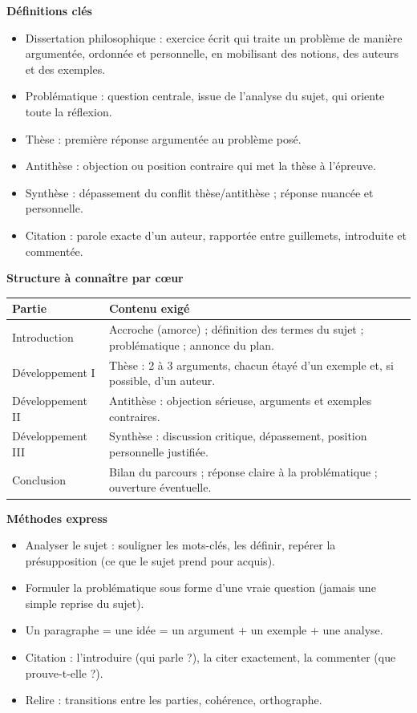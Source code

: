 \documentclass[11pt]{article}
\newcommand{\cle}[1]{{\popxbold\color{popdark}#1}}
\begin{document}
\begin{bilan}
\textbf{Définitions clés}
\begin{itemize}
  \item \cle{Dissertation philosophique} : exercice écrit qui traite un problème de manière argumentée, ordonnée et personnelle, en mobilisant des notions, des auteurs et des exemples.
  \item \cle{Problématique} : question centrale, issue de l'analyse du sujet, qui oriente toute la réflexion.
  \item \cle{Thèse} : première réponse argumentée au problème posé.
  \item \cle{Antithèse} : objection ou position contraire qui met la thèse à l'épreuve.
  \item \cle{Synthèse} : dépassement du conflit thèse/antithèse ; réponse nuancée et personnelle.
  \item \cle{Citation} : parole exacte d'un auteur, rapportée entre guillemets, introduite et commentée.
\end{itemize}

\textbf{Structure à connaître par c\oe ur}
\begin{center}
\begin{tabularx}{\linewidth}{|l|X|}
\hline
\rowcolor{popblueL} \textbf{Partie} & \textbf{Contenu exigé} \\
\hline
Introduction & Accroche (amorce) ; définition des termes du sujet ; problématique ; annonce du plan. \\
\hline
Développement I & Thèse : 2 à 3 arguments, chacun étayé d'un exemple et, si possible, d'un auteur. \\
\hline
Développement II & Antithèse : objection sérieuse, arguments et exemples contraires. \\
\hline
Développement III & Synthèse : discussion critique, dépassement, position personnelle justifiée. \\
\hline
Conclusion & Bilan du parcours ; réponse claire à la problématique ; ouverture éventuelle. \\
\hline
\end{tabularx}
\end{center}

\textbf{Méthodes express}
\begin{itemize}
  \item Analyser le sujet : souligner les mots-clés, les définir, repérer la présupposition (ce que le sujet prend pour acquis).
  \item Formuler la problématique sous forme d'une vraie question (jamais une simple reprise du sujet).
  \item Un paragraphe = une idée = un argument + un exemple + une analyse.
  \item Citation : l'introduire (qui parle ?), la citer exactement, la commenter (que prouve-t-elle ?).
  \item Relire : transitions entre les parties, cohérence, orthographe.
\end{itemize}
\end{bilan}
\end{document}
